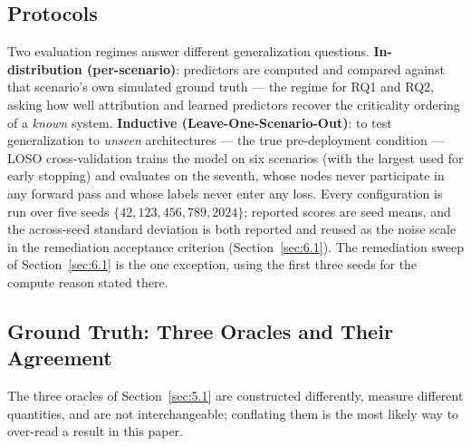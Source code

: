 \hypertarget{protocols}{%
\subsection{Protocols}\label{protocols}}

\label{sec:7.3}

Two evaluation regimes answer different generalization questions.
\textbf{In-distribution (per-scenario)}: predictors are computed and compared against that scenario's
own simulated ground truth --- the regime for RQ1 and RQ2, asking how well attribution and learned
predictors recover the criticality ordering of a \emph{known} system. \textbf{Inductive
(Leave-One-Scenario-Out)}: to test generalization to \emph{unseen} architectures --- the true
pre-deployment condition --- LOSO cross-validation trains the model on six scenarios (with the
largest used for early stopping) and evaluates on the seventh, whose nodes never participate in any
forward pass and whose labels never enter any loss. Every configuration is run over five seeds
\(\{42, 123, 456, 789, 2024\}\); reported scores are seed means, and the across-seed standard
deviation is both reported and reused as the noise scale in the remediation acceptance criterion
(Section~\ref{sec:6.1}). The remediation sweep of Section~\ref{sec:6.1} is the one exception, using
the first three seeds for the compute reason stated there.

\hypertarget{ground-truth-three-oracles-and-their-agreement}{%
\subsection{Ground Truth: Three Oracles and Their Agreement}\label{ground-truth-three-oracles-and-their-agreement}}

\label{sec:7.4}

The three oracles of Section~\ref{sec:5.1} are constructed differently, measure different quantities,
and are not interchangeable; conflating them is the most likely way to over-read a result in this
paper.

